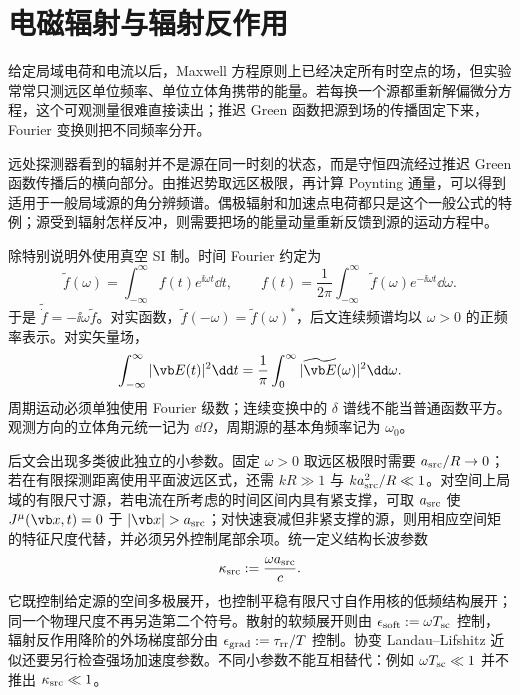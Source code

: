\chapter{电磁辐射与辐射反作用}
\label{chap:maxwell-radiation}

给定局域电荷和电流以后，Maxwell 方程原则上已经决定所有时空点的场，但实验常常只测远区单位频率、单位立体角携带的能量。若每换一个源都重新解偏微分方程，这个可观测量很难直接读出；推迟 Green 函数把源到场的传播固定下来，Fourier 变换则把不同频率分开。

远处探测器看到的辐射并不是源在同一时刻的状态，而是守恒四流经过推迟 Green 函数传播后的横向部分。由推迟势取远区极限，再计算 Poynting 通量，可以得到适用于一般局域源的角分辨频谱。偶极辐射和加速点电荷都只是这个一般公式的特例；源受到辐射怎样反冲，则需要把场的能量动量重新反馈到源的运动方程中。

除特别说明外使用真空 SI 制。时间 Fourier 约定为
\begin{equation}
 \widetilde f(\omega)=\int_{-\infty}^{\infty}f(t)e^{\ii\omega t}\dd t,
 \qquad
 f(t)=\frac{1}{2\pi}\int_{-\infty}^{\infty}\widetilde f(\omega)e^{-\ii\omega t}\dd\omega .
 \label{eq:phys-rr-fourier-convention}
\end{equation}
于是 \(\widetilde{\dot f}=-\ii\omega\widetilde f\)。对实函数，\(\widetilde f(-\omega)=\widetilde f(\omega)^*\)，后文连续频谱均以 \(\omega>0\) 的正频率表示。对实矢量场，
\[
 \int_{-\infty}^{\infty}|\vb E(t)|^2\dd t
 =\frac1\pi\int_0^\infty|\widetilde{\vb E}(\omega)|^2\dd\omega .
\]
周期运动必须单独使用 Fourier 级数；连续变换中的 \(\delta\) 谱线不能当普通函数平方。观测方向的立体角元统一记为 \(\dd\Omega\)，周期源的基本角频率记为 \(\omega_0\)。

后文会出现多类彼此独立的小参数。固定 \(\omega>0\) 取远区极限时需要 \(a_{\rm src}/R\to0\)；若在有限探测距离使用平面波远区式，还需 \(kR\gg1\) 与 \(ka_{\rm src}^2/R\ll1\)。对空间上局域的有限尺寸源，若电流在所考虑的时间区间内具有紧支撑，可取 \(a_{\rm src}\) 使 \(J^\mu(\vb x,t)=0\) 于 \(|\vb x|>a_{\rm src}\)；对快速衰减但非紧支撑的源，则用相应空间矩的特征尺度代替，并必须另外控制尾部余项。统一定义结构长波参数
\begin{equation}
 \kappa_{\rm src}:=\frac{\omega a_{\rm src}}{c}.
 \label{eq:phys-rr-source-size-control}
\end{equation}
它既控制给定源的空间多极展开，也控制平稳有限尺寸自作用核的低频结构展开；同一个物理尺度不再另造第二个符号。散射的软频展开则由 \(\epsilon_{\rm soft}:=\omega T_{\rm sc}\) 控制，辐射反作用降阶的外场梯度部分由 \(\epsilon_{\rm grad}:=\tau_{\rm rr}/T\) 控制。协变 Landau--Lifshitz 近似还要另行检查强场加速度参数。不同小参数不能互相替代：例如 \(\omega T_{\rm sc}\ll1\) 并不推出 \(\kappa_{\rm src}\ll1\)。

